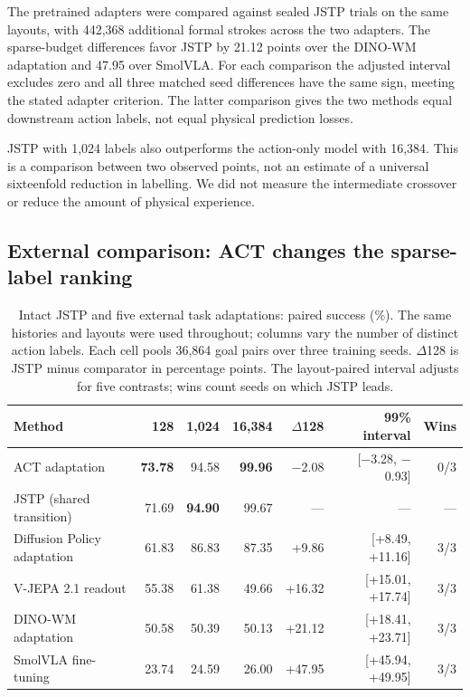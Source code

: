 \documentclass[11pt]{article}
\begin{document}
The pretrained adapters were compared against sealed JSTP trials on the same layouts, with 442,368 additional formal strokes across the two adapters. The sparse-budget differences favor JSTP by 21.12 points over the DINO-WM adaptation and 47.95 over SmolVLA. For each comparison the adjusted interval excludes zero and all three matched seed differences have the same sign, meeting the stated adapter criterion. The latter comparison gives the two methods equal downstream action labels, not equal physical prediction losses.

JSTP with 1,024 labels also outperforms the action-only model with 16,384. This is a comparison between two observed points, not an estimate of a universal sixteenfold reduction in labelling. We did not measure the intermediate crossover or reduce the amount of physical experience.

\subsection{External comparison: ACT changes the sparse-label ranking}

\begin{table}[htbp]
\centering\small\setlength{\tabcolsep}{3.5pt}
\caption{Intact JSTP and five external task adaptations: paired success (\%). The same histories and layouts were used throughout; columns vary the number of distinct action labels. Each cell pools 36,864 goal pairs over three training seeds. \ensuremath{\Delta}128 is JSTP minus comparator in percentage points. The layout-paired interval adjusts for five contrasts; wins count seeds on which JSTP leads.}
\label{tab:2}
\begin{tabularx}{\linewidth}{@{}>{\raggedright\arraybackslash}Xrrrrrr@{}}
\toprule
\textbf{Method} & \textbf{128} & \textbf{1,024} & \textbf{16,384} & \textbf{\ensuremath{\Delta}128} & \textbf{99\% interval} & \textbf{Wins} \\
\midrule
ACT adaptation & \textbf{73.78} & 94.58 & \textbf{99.96} & \ensuremath{-}2.08 & [\ensuremath{-}3.28, \ensuremath{-}0.93] & 0/3 \\
JSTP (shared transition) & 71.69 & \textbf{94.90} & 99.67 & --- & --- & --- \\
Diffusion Policy adaptation & 61.83 & 86.83 & 87.35 & +9.86 & [+8.49, +11.16] & 3/3 \\
V-JEPA 2.1 readout & 55.38 & 61.38 & 49.66 & +16.32 & [+15.01, +17.74] & 3/3 \\
DINO-WM adaptation & 50.58 & 50.39 & 50.13 & +21.12 & [+18.41, +23.71] & 3/3 \\
SmolVLA fine-tuning & 23.74 & 24.59 & 26.00 & +47.95 & [+45.94, +49.95] & 3/3 \\
\bottomrule
\end{tabularx}
\end{table}
\end{document}
